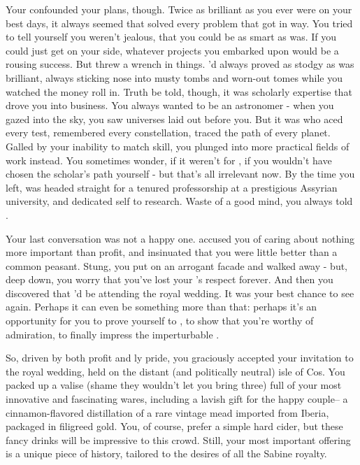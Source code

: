 \documentclass[char]{Kos}
\begin{document}
Your \cAnarchist{\sibling} \cAnarchist{} confounded your plans, though. Twice as brilliant as you ever were on your best days, it always seemed that \cAnarchist{\they} solved every problem that got in \cAnarchist{\their} way. You tried to tell yourself you weren't jealous, that you could be as smart as \cAnarchist{\they} was. If you could just get \cAnarchist{\them} on your side, whatever projects you embarked upon would be a rousing success. But \cAnarchist{\they} threw a wrench in things. \cAnarchist{\they}'d always proved as stodgy as \cAnarchist{\they} was brilliant, always sticking \cAnarchist{\their} nose into musty tombs and worn-out tomes while you watched the money roll in. Truth be told, though, it was \cAnarchist{\their} scholarly expertise that drove you into business. You always wanted to be an astronomer - when you gazed into the sky, you saw universes laid out before you. But it was \cAnarchist{} who aced every test, remembered every constellation, traced the path of every planet. Galled by your inability to match \cAnarchist{\their} skill, you plunged into more practical fields of work instead. You sometimes wonder, if it weren't for \cAnarchist{}, if you wouldn't have chosen the scholar's path yourself - but that's all irrelevant now. By the time you left, \cAnarchist{\they} was headed straight for a tenured professorship at a prestigious Assyrian university, and dedicated \cAnarchist{\them}self to research. Waste of a good mind, you always told \cAnarchist{\them}.

Your last conversation was not a happy one. \cAnarchist{\They} accused you of caring about nothing more important than profit, and insinuated that you were little better than a common peasant. Stung, you put on an arrogant facade and walked away - but, deep down, you worry that you've lost your \cAnarchist{\sibling}'s respect forever. And then you discovered that \cAnarchist{\they}'d be attending the royal wedding. It was your best chance to see \cAnarchist{\them} again. Perhaps it can even be something more than that: perhaps it's an opportunity for you to prove yourself to \cAnarchist{\them}, to show \cAnarchist{\them} that you're worthy of \cAnarchist{\their} admiration, to finally impress the imperturbable \cAnarchist{}.

So, driven by both profit and \cMerchant{\sibling}ly pride, you graciously accepted your invitation to the royal wedding, held on the distant (and politically neutral) isle of Cos. You packed up a valise (shame they wouldn't let you bring three) full of your most innovative and fascinating wares, including a lavish gift for the happy couple-- a cinnamon-flavored distillation of a rare vintage mead imported from Iberia, packaged in filigreed gold. You, of course, prefer a simple hard cider, but these fancy drinks will be impressive to this crowd. Still, your most important offering is a unique piece of history, tailored to the desires of all the Sabine royalty. 
\end{document}
